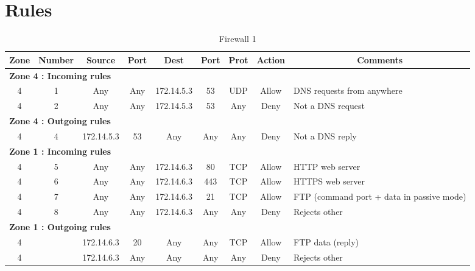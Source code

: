 \documentclass[a4paper,titlepage]{article}
\begin{document}
\begin{itemize}

\end{itemize}

\section{Rules}
\label{sec:Rules}

\begin{table}[h]
	\center
	\begin{tabular}{c|c|cc|cc|ccl}
		Zone & Number & Source & Port & Dest & Port & Prot & Action & \multicolumn{1}{c}{Comments}\\
		\hline
		\multicolumn{9}{l}{\textbf{Zone 4 : Incoming rules}}\\
		4 & 1 & Any & Any & 172.14.5.3 & 53 & UDP & Allow & DNS requests from anywhere\\
		4 & 2 & Any & Any & 172.14.5.3 & 53 & Any & Deny & Not a DNS request\\
		\hline
		\multicolumn{9}{l}{\textbf{Zone 4 : Outgoing rules}}\\
		4 & 4 & 172.14.5.3 & 53 & Any & Any & Any & Deny & Not a DNS reply\\
		\hline
		\multicolumn{9}{l}{\textbf{Zone 1 : Incoming rules}}\\
		4 & 5 & Any & Any & 172.14.6.3 & 80 & TCP & Allow & HTTP web server\\
		4 & 6 & Any & Any & 172.14.6.3 & 443 & TCP & Allow & HTTPS web server\\
		4 & 7 & Any & Any & 172.14.6.3 & 21 & TCP & Allow & FTP (command port + data in passive mode)\\
		4 & 8 & Any & Any & 172.14.6.3 & Any & Any & Deny & Rejects other\\
		\hline
		\multicolumn{9}{l}{\textbf{Zone 1 : Outgoing rules}}\\
		4 & & 172.14.6.3 & 20 & Any & Any & TCP & Allow & FTP data (reply)\\
		4 & & 172.14.6.3 & Any & Any & Any & Any & Deny & Rejects other\\
	\end{tabular}
	\caption{Firewall 1}
\end{table}
\end{document}
